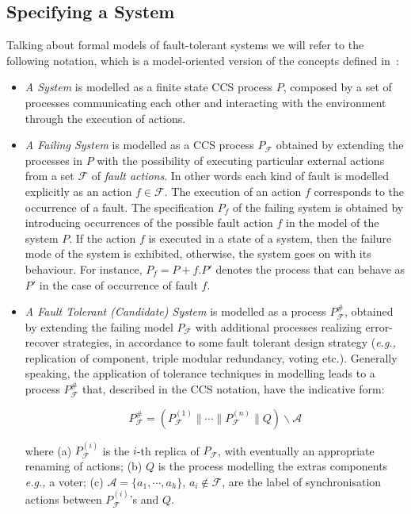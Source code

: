 \documentclass{entcs}
\newcommand{\eg}{\emph{e.g., }}
\newcommand{\fault}{f}
\newcommand{\Faults}{\mathcal{F}}
\newcommand{\faulttolerant}[1]{{#1}^{\#}_\Faults}
\newcommand{\res}{\backslash}
\begin{document}
\subsection{Specifying a System}
\label{specifying:sec}
Talking about formal models of fault-tolerant systems we will refer to the
following notation, which is a model-oriented version of the concepts defined
in~\cite{L95}:

\begin{itemize}
\item
{\em A System} is modelled as a finite state CCS process $P$, composed by a set of
processes communicating each other and interacting with the environment
through the execution of actions.
%
\item {\em A Failing System} is modelled as a CCS process $P_\Faults$ obtained
  by extending the processes in $P$ with the possibility of executing
  particular external actions from a set $\Faults$ of {\em fault
  actions}. In other words each kind of fault is modelled explicitly
  as an action $\fault \in \Faults$.  The execution of an action $f$
  corresponds to the occurrence of a fault. The specification
  $P_\fault$ of the failing system is obtained by introducing
  occurrences of the possible fault action $f$ in the model of the
  system $P$. If the action $\fault$ is executed in a state of a
  system, then the failure mode of the system is exhibited, otherwise,
  the system goes on with its behaviour. For instance, $P_f = P +
  f.P'$ denotes the process that can behave as $P'$ in the case of
  occurrence of fault $f$.%

\item {\em A Fault Tolerant (Candidate) System} is modelled as a process
  $\faulttolerant{P}$, obtained by extending the failing model $P_\Faults$
  with additional processes realizing error-recover strategies, in accordance
  to some fault tolerant design strategy (\eg replication of component, triple
  modular redundancy, voting etc.).  Generally speaking, the application of
  tolerance techniques in modelling leads to a process $\faulttolerant{P}$
  that, described in the CCS notation, have the indicative form:%

\begin{displaymath}
\faulttolerant{P} =
(P^{(1)}_\Faults \parallel \cdots \parallel P^{(n)}_\Faults \parallel
Q) \res \mathcal{A}
\end{displaymath}%

where (a) $P^{(i)}_\Faults$ is the $i$-th replica of $P_\Faults$, with
eventually an appropriate renaming of actions; (b) $Q$ is the process
modelling the extras components \eg a voter; (c) $\mathcal{A} = \{a_1, \cdots,
a_h\}$, $a_i \not\in {\Faults}$, are the label of synchronisation actions
between $P^{(i)}_\Faults$'s and $Q$.
\end{itemize}%
\end{document}
